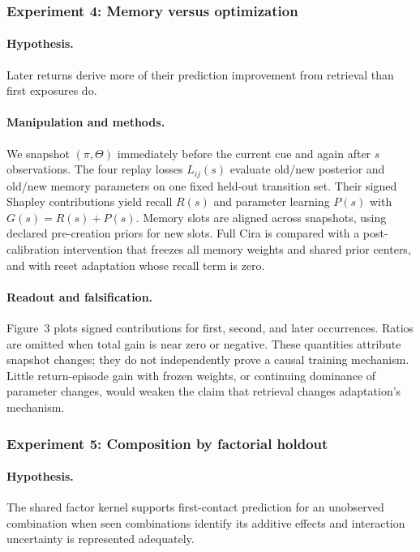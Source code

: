 \subsubsection{Experiment 4: Memory versus optimization}
\paragraph{Hypothesis.}
Later returns derive more of their prediction improvement from retrieval than first exposures do.

\paragraph{Manipulation and methods.}
We snapshot $(\pi,\Theta)$ immediately before the current cue and again after $s$ observations. The four replay losses $L_{ij}(s)$ evaluate old/new posterior and old/new memory parameters on one fixed held-out transition set. Their signed Shapley contributions yield recall $R(s)$ and parameter learning $P(s)$ with $G(s)=R(s)+P(s)$. Memory slots are aligned across snapshots, using declared pre-creation priors for new slots. Full Cira is compared with a post-calibration intervention that freezes all memory weights and shared prior centers, and with reset adaptation whose recall term is zero.

\paragraph{Readout and falsification.}
Figure~3 plots signed contributions for first, second, and later occurrences. Ratios are omitted when total gain is near zero or negative. These quantities attribute snapshot changes; they do not independently prove a causal training mechanism. Little return-episode gain with frozen weights, or continuing dominance of parameter changes, would weaken the claim that retrieval changes adaptation's mechanism.

\subsubsection{Experiment 5: Composition by factorial holdout}
\paragraph{Hypothesis.}
The shared factor kernel supports first-contact prediction for an unobserved combination when seen combinations identify its additive effects and interaction uncertainty is represented adequately.

